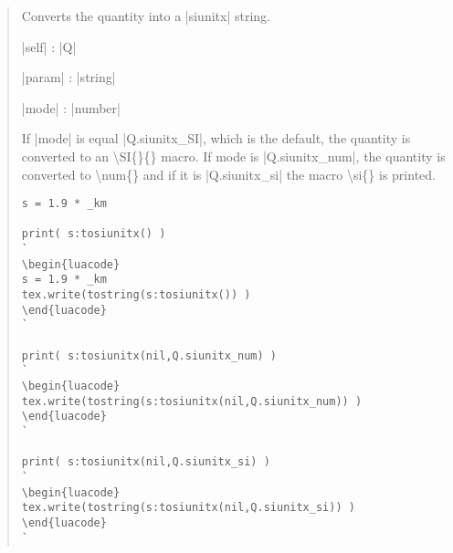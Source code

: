 \documentclass{ltxdoc}
\begin{document}
\begin{quote}
  Converts the quantity into a |siunitx| string. 

  \begin{description}
  \item |self| : |Q|

  \item |param| : |string|

  \item |mode| : |number|
  \end{description}

  If |mode| is equal |Q.siunitx_SI|, which is the default, the quantity is converted to an \textbackslash SI\{\}\{\} macro. If mode is |Q.siunitx_num|, the quantity is converted to \textbackslash num\{\} and if it is |Q.siunitx_si| the macro \textbackslash si\{\} is printed.

\begin{lstlisting}
s = 1.9 * _km

print( s:tosiunitx() )
`
\begin{luacode}
s = 1.9 * _km
tex.write(tostring(s:tosiunitx()) )
\end{luacode}
`

print( s:tosiunitx(nil,Q.siunitx_num) )
`
\begin{luacode}
tex.write(tostring(s:tosiunitx(nil,Q.siunitx_num)) )
\end{luacode}
`

print( s:tosiunitx(nil,Q.siunitx_si) )
`
\begin{luacode}
tex.write(tostring(s:tosiunitx(nil,Q.siunitx_si)) )
\end{luacode}
`
\end{lstlisting}

\end{quote}
\end{document}
